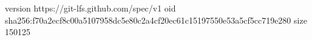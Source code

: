 version https://git-lfs.github.com/spec/v1
oid sha256:f70a2ecf8c00a5107958dc5e80c2a4cf20ec61c15197550e53a5cf5cc719e280
size 150125
